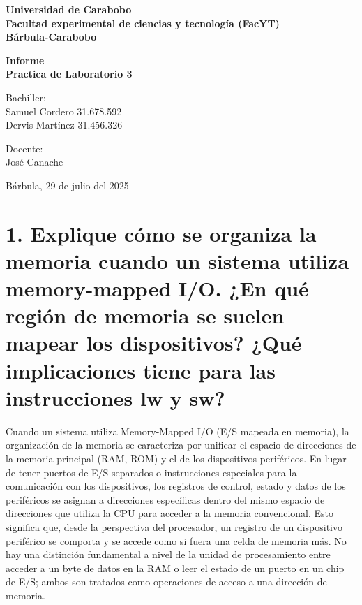 \documentclass[12pt, a4paper]{article}
\begin{document}
\begin{center}
    \textbf{\Large Universidad de Carabobo} \\
    \textbf{\Large Facultad experimental de ciencias y tecnología (FacYT)} \\
    \textbf{\Large Bárbula-Carabobo}
\end{center}

\vspace{1cm}

\begin{center}
    \textbf{\Huge Informe} \\
    \textbf{\Large Practica de Laboratorio 3}
\end{center}

\vspace{1.5cm}

\begin{minipage}[t]{0.45\textwidth}
    \RaggedRight
    Bachiller: \\
    Samuel Cordero 31.678.592 \\
    Dervis Martínez 31.456.326
\end{minipage}
\hfill
\begin{minipage}[t]{0.45\textwidth}
    \RaggedLeft
    Docente: \\
    José Canache
\end{minipage}

\vspace{1.5cm}

\begin{center}
    Bárbula, 29 de julio del 2025
\end{center}

\newpage

\section*{1. Explique cómo se organiza la memoria cuando un sistema utiliza memory-mapped I/O. ¿En qué región de memoria se suelen mapear los dispositivos? ¿Qué implicaciones tiene para las instrucciones lw y sw?}

Cuando un sistema utiliza Memory-Mapped I/O (E/S mapeada en memoria), la organización de la memoria se caracteriza por unificar el espacio de direcciones de la memoria principal (RAM, ROM) y el de los dispositivos periféricos. En lugar de tener puertos de E/S separados o instrucciones especiales para la comunicación con los dispositivos, los registros de control, estado y datos de los periféricos se asignan a direcciones específicas dentro del mismo espacio de direcciones que utiliza la CPU para acceder a la memoria convencional. Esto significa que, desde la perspectiva del procesador, un registro de un dispositivo periférico se comporta y se accede como si fuera una celda de memoria más. No hay una distinción fundamental a nivel de la unidad de procesamiento entre acceder a un byte de datos en la RAM o leer el estado de un puerto en un chip de E/S; ambos son tratados como operaciones de acceso a una dirección de memoria.
\end{document}

